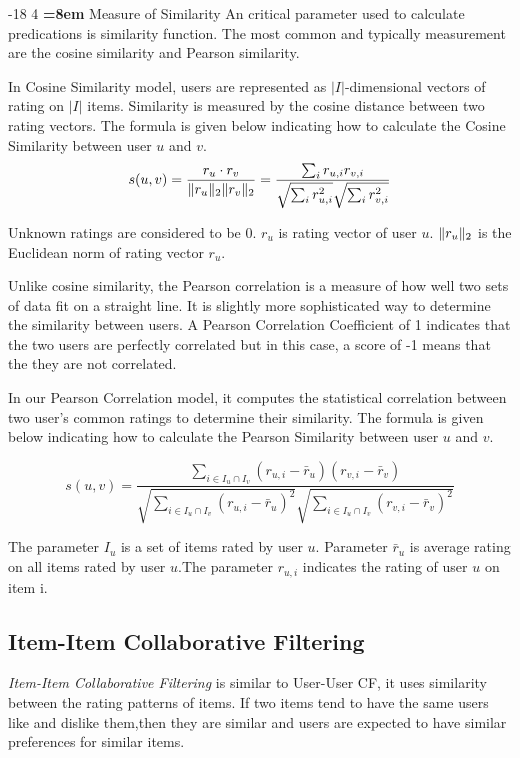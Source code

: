 \documentclass{llncs}
\makeatletter
\DeclarePairedDelimiter{\norm}{\lVert}{\rVert}
\renewcommand\subsubsection{\@startsection{subsubsection}{3}{\z@}%
	{-18\p@ \@plus -4\p@ \@minus -4\p@}%
	{4\p@ \@plus 2\p@ \@minus 2\p@}%
	{\normalfont\normalsize\bfseries\boldmath
		\rightskip=\z@ \@plus 8em\pretolerance=10000 }}
\makeatother
\begin{document}
\subsubsection{Measure of Similarity}
An critical parameter used to calculate predications is similarity function. The most common and typically measurement are the cosine similarity and Pearson similarity. 

In Cosine Similarity model, users are represented as $|\textit{I}|$-dimensional vectors of rating on $|\textit{I}|$ items. Similarity is measured by the cosine distance between two rating vectors. The formula is given below indicating how to calculate the Cosine Similarity between user $u$ and $v$. 
\begin{equation}
s(u,v) = \frac{r_{u}\cdot r_{v}}{\norm {r_{u}}_{2} \norm {r_{v}}_{2}}=\frac{\sum\nolimits_{i} r_{u,i}r_{v,i}}{\sqrt{\sum\nolimits_{i} {r^{2}_{u,i}}} \sqrt{\sum\nolimits_{i} {r^{2}_{v,i}}}} 
\end{equation}

Unknown ratings are considered to be 0. $r_{u}$ is rating vector of user $u$. $\norm {r_{u}}_{2}$ is the Euclidean norm of rating vector $r_{u}$.

Unlike cosine similarity, the Pearson correlation is a measure of how well two sets of data fit on a straight line. It is slightly more sophisticated way to determine the similarity between users. A Pearson Correlation Coefficient of 1 indicates that the two users are perfectly correlated but in this case, a score of -1 means that the they are not correlated.

In our Pearson Correlation model, it computes the statistical correlation between two user's common ratings to determine their similarity. The formula is given below indicating how to calculate the Pearson Similarity between user $u$ and $v$. 

\begin{equation}
	s(u,v) =\frac{{\sum\nolimits_{i \in {I_{u} \cap I_{v}}}(r_{u,i}-\bar{r}_{u})(r_{v,i}-\bar{r}_{v})}}{ \sqrt{{\sum\nolimits_{i \in {I_{u} \cap I_{v}}}(r_{u,i}-\bar{r}_{u})^2}} \sqrt{{\sum\nolimits_{i \in {I_{u} \cap I_{v}}}(r_{v,i}-\bar{r}_{v})^2}}}
\end{equation}

The parameter $I_{u}$ is a set of items rated by user $u$. Parameter ${\bar r_{u}}$ is average rating on all items rated by user $u$.The parameter $r_{u,i}$ indicates the rating of user $u$ on item i.

\subsection{Item-Item Collaborative Filtering}
\textit{Item-Item Collaborative Filtering} is similar to User-User CF, it uses similarity between the rating patterns of items. If two items tend to have the same users like and dislike them,then they are similar and users are expected to have similar preferences for similar items.
\end{document}
